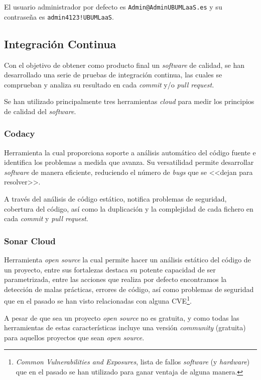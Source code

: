 El usuario administrador por defecto es \texttt{Admin@AdminUBUMLaaS.es} y su contraseña es \texttt{admin4123!UBUMLaaS}.

\subsection{Integración Continua}
Con el objetivo de obtener como producto final un \textit{software} de calidad, se han desarrollado una serie de pruebas de integración continua, las cuales se comprueban y analiza su resultado en cada \textit{commit} y/o \textit{pull request.}

Se han utilizado principalmente tres herramientas \textit{cloud} para medir los principios de calidad del \textit{software}.

\subsubsection{Codacy}
Herramienta la cual proporciona soporte a análisis automático del código fuente e identifica los problemas a medida que avanza. Su versatilidad permite desarrollar \textit{software} de manera eficiente, reduciendo el número de \textit{bugs} que se <<dejan para resolver>>. 

A través del análisis de código estático, notifica problemas de seguridad, cobertura del código, así como la duplicación y la complejidad de cada fichero en cada \textit{commit} y \textit{pull request}.


\subsubsection{Sonar Cloud}
Herramienta \textit{open source} la cual permite hacer un análisis estático del código de un proyecto, entre sus fortalezas destaca su potente capacidad de ser parametrizada, entre las acciones que realiza por defecto encontramos la detección de malas prácticas, errores de código, así como problemas de seguridad que en el pasado se han visto relacionadas con alguna CVE\footnote{\textit{Common Vulnerabilities and Exposures}, lista de fallos \textit{software} (y \textit{hardware}) que en el pasado se han utilizado para ganar ventaja de alguna manera.}.

A pesar de que sea un proyecto \textit{open source} no es gratuita, y como todas las herramientas de estas características incluye una versión \textit{community} (gratuita) para aquellos proyectos que sean \textit{open source}.

